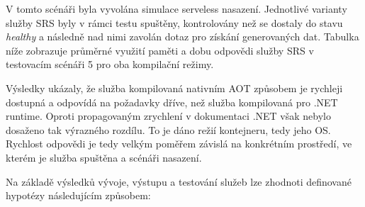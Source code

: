 
V tomto scénáři byla vyvolána simulace serveless nasazení. Jednotlivé varianty služby SRS byly v rámci testu spuštěny, kontrolovány než se dostaly do stavu \emph{healthy} a následně nad nimi zavolán dotaz pro získání generovaných dat. Tabulka níže zobrazuje průměrné využití paměti a dobu odpovědi služby SRS v testovacím scénáři 5 pro oba kompilační režimy. 


Výsledky ukázaly, že služba kompilovaná nativním AOT způsobem je rychleji dostupná a odpovídá na požadavky dříve, než služba kompilovaná pro .NET runtime. Oproti propagovaným zrychlení v dokumentaci .NET však nebylo dosaženo tak výrazného rozdílu. To je dáno režií kontejneru, tedy jeho OS. Rychlost odpovědi je tedy velkým poměřem závislá na konkrétním prostředí, ve kterém je služba spuštěna a scénáři nasazení.


Na základě výsledků vývoje, výstupu a testování služeb lze zhodnoti definované hypotézy následujícím způsobem:

